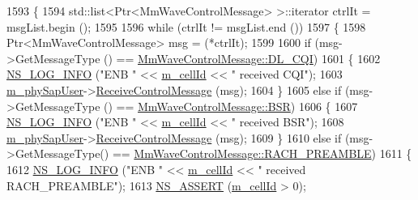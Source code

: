 \begin{DoxyCode}
1593 \{
1594         std::list<Ptr<MmWaveControlMessage> >::iterator ctrlIt = msgList.begin ();
1595 
1596         \textcolor{keywordflow}{while} (ctrlIt != msgList.end ())
1597         \{
1598                 Ptr<MmWaveControlMessage> msg = (*ctrlIt);
1599 
1600                 \textcolor{keywordflow}{if} (msg->GetMessageType () == \hyperlink{classns3_1_1MmWaveControlMessage_afd7af53dea4ef8b652cf206acd508869a86a81d8d22142bcbb5be5abe46eddb97}{MmWaveControlMessage::DL\_CQI})
1601                 \{
1602                         \hyperlink{group__logging_gafbd73ee2cf9f26b319f49086d8e860fb}{NS\_LOG\_INFO} (\textcolor{stringliteral}{"ENB "} << \hyperlink{classns3_1_1MmWavePhy_a0594531da45f93220d4f5de292bae823}{m\_cellId} << \textcolor{stringliteral}{" received CQI"});
1603                         \hyperlink{classns3_1_1MmWaveEnbPhy_a666331e7a8200a6b17215bdda089f671}{m\_phySapUser}->\hyperlink{classns3_1_1MmWaveEnbPhySapUser_af9ec7de3885e371f394e017f4855996f}{ReceiveControlMessage} (msg);
1604                 \}
1605                 \textcolor{keywordflow}{else} \textcolor{keywordflow}{if} (msg->GetMessageType () == \hyperlink{classns3_1_1MmWaveControlMessage_afd7af53dea4ef8b652cf206acd508869ae6dfe19c64eac4df7cf4603d0ca69fd4}{MmWaveControlMessage::BSR})
1606                 \{
1607                         \hyperlink{group__logging_gafbd73ee2cf9f26b319f49086d8e860fb}{NS\_LOG\_INFO} (\textcolor{stringliteral}{"ENB "} << \hyperlink{classns3_1_1MmWavePhy_a0594531da45f93220d4f5de292bae823}{m\_cellId} << \textcolor{stringliteral}{" received BSR"});
1608                         \hyperlink{classns3_1_1MmWaveEnbPhy_a666331e7a8200a6b17215bdda089f671}{m\_phySapUser}->\hyperlink{classns3_1_1MmWaveEnbPhySapUser_af9ec7de3885e371f394e017f4855996f}{ReceiveControlMessage} (msg);
1609                 \}
1610                 \textcolor{keywordflow}{else} \textcolor{keywordflow}{if} (msg->GetMessageType() == 
      \hyperlink{classns3_1_1MmWaveControlMessage_afd7af53dea4ef8b652cf206acd508869aa5c50c57231f74cdc23fb3f2b86e1728}{MmWaveControlMessage::RACH\_PREAMBLE})
1611           \{
1612                         \hyperlink{group__logging_gafbd73ee2cf9f26b319f49086d8e860fb}{NS\_LOG\_INFO} (\textcolor{stringliteral}{"ENB "} << \hyperlink{classns3_1_1MmWavePhy_a0594531da45f93220d4f5de292bae823}{m\_cellId} << \textcolor{stringliteral}{" received RACH\_PREAMBLE"});
1613                         \hyperlink{assert_8h_a6dccdb0de9b252f60088ce281c49d052}{NS\_ASSERT} (\hyperlink{classns3_1_1MmWavePhy_a0594531da45f93220d4f5de292bae823}{m\_cellId} > 0);

\end{DoxyCode}
